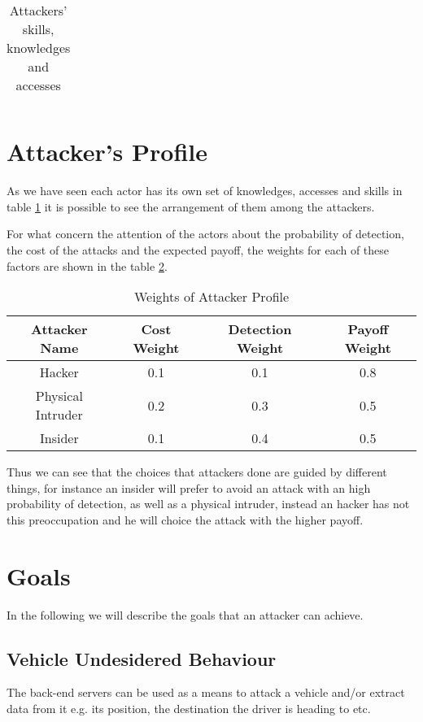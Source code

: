\begin{table}[htpb]
\begin{tabular}{|c|c|c|c|}
	\end{tabular}
	\caption{Attackers' skills, knowledges and accesses}
	\label{tab:profiles}
\end{table}

\section{Attacker's Profile}
\noindent As we have seen each actor has its own set of knowledges, accesses and skills in table \ref{tab:profiles} it is possible to see the arrangement of them among the attackers.


\noindent For what concern the attention of the actors about the probability of detection, the cost of the attacks and the expected payoff, the weights for each of these factors are shown in the table \ref{tab:weights}.

\begin{table}[htpb]
	\centering
	\begin{tabular}{|c|c|c|c|}
		\hline
		\textbf{Attacker Name} & \textbf{Cost Weight} & \textbf{Detection Weight} & \textbf{Payoff Weight} \\ \hline
		Hacker                 & 0.1                    & 0.1                       & 0.8                    \\ \hline
		Physical Intruder      & 0.2                  & 0.3                       & 0.5                    \\ \hline
		Insider                & 0.1                  & 0.4                       & 0.5                    \\ \hline
	\end{tabular}
	\caption{Weights of Attacker Profile}
	\label{tab:weights}
\end{table}

\noindent  Thus we can see that the choices that attackers done are guided by different things, for instance an insider will prefer to avoid an attack with an high probability of detection, as well as a physical intruder, instead an hacker has not this preoccupation and he will choice the attack with the higher payoff.

\section{Goals}

\noindent In the following we will describe the goals that an attacker can achieve.

\subsection*{Vehicle Undesidered Behaviour}
The back-end servers can be used as a means to attack a vehicle and/or extract data from it e.g. its position, the destination the driver is heading to etc.

